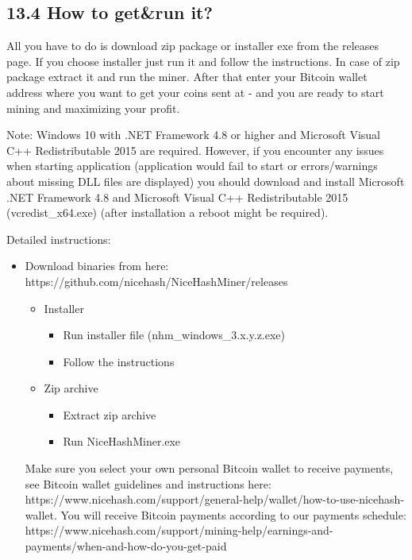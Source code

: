 \subsection*{13.4 How to get\&run it?}
All you have to do is download zip package or installer exe from the releases page. If you choose installer just run it and follow the instructions. In case of zip package extract it and run the miner. After that enter your Bitcoin wallet address where you want to get your coins sent at - and you are ready to start mining and maximizing your profit.\vspace{.3cm}

Note: Windows 10 with .NET Framework 4.8 or higher and Microsoft Visual C++ Redistributable 2015 are required. However, if you encounter any issues when starting application (application would fail to start or errors/warnings about missing DLL files are displayed) you should download and install Microsoft .NET Framework 4.8 and Microsoft Visual C++ Redistributable 2015 (vcredist\_x64.exe) (after installation a reboot might be required).\vspace{.3cm}

Detailed instructions:\vspace{.3cm}
\begin{itemize}
	\item Download binaries from here: https://github.com/nicehash/NiceHashMiner/releases
\begin{itemize}
	\item Installer
\begin{itemize}
	\item Run installer file (nhm\_windows\_3.x.y.z.exe)
	\item Follow the instructions
\end{itemize}
\item Zip archive
\begin{itemize}
	\item Extract zip archive
	\item Run NiceHashMiner.exe
\end{itemize}
\end{itemize}
Make sure you select your own personal Bitcoin wallet to receive payments, see Bitcoin wallet guidelines and instructions here:\\ https://www.nicehash.com/support/general-help/wallet/how-to-use-nicehash-wallet.
You will receive Bitcoin payments according to our payments schedule:\\ https://www.nicehash.com/support/mining-help/earnings-and-payments/when-and-how-do-you-get-paid

\end{itemize}

